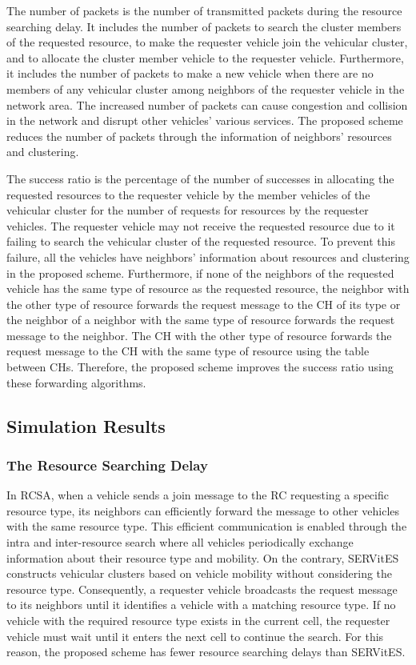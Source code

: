 \documentclass[sensors,article,accept,moreauthors,pdftex]{Definitions/mdpi}
\begin{document}
The number of packets is the number of transmitted packets during the resource searching delay.
It includes the number of packets to search the cluster members of the requested resource, to make the requester vehicle join the vehicular cluster, and to allocate the cluster member vehicle to the requester vehicle.
Furthermore, it includes the number of packets to make a new vehicle when there are no members of any vehicular cluster among neighbors of the requester vehicle in the network area.
The increased number of packets can cause congestion and collision in the network and disrupt other vehicles' various services.
The proposed scheme reduces the number of packets through the information of neighbors' resources and clustering.

The success ratio is the percentage of the number of successes in allocating the requested resources to the requester vehicle by the member vehicles of the vehicular cluster for the number of requests for resources by the requester vehicles.
The requester vehicle may not receive the requested resource due to it failing to search the vehicular cluster of the requested resource.
To prevent this failure, all the vehicles have neighbors' information about resources and clustering in the proposed scheme.
Furthermore, if none of the neighbors of the requested vehicle has the same type of resource as the requested resource, the neighbor with the other type of resource forwards the request message to the CH of its type or the neighbor of a neighbor with the same type of resource forwards the request message to the neighbor.
The CH with the other type of resource forwards the request message to the CH with the same type of resource using the table between CHs.
Therefore, the proposed scheme improves the success ratio using these forwarding algorithms.


\subsection{Simulation Results} \label{sec.s2}

\subsubsection{The Resource Searching Delay}



In RCSA, when a vehicle sends a join message to the RC requesting a specific resource type, its neighbors can efficiently forward the message to other vehicles with the same resource type. This efficient communication is enabled through the intra and inter-resource search where all vehicles periodically exchange information about their resource type and mobility. On the contrary, SERVitES constructs vehicular clusters based on vehicle mobility without considering the resource type. Consequently, a requester vehicle broadcasts the request message to its neighbors until it identifies a vehicle with a matching resource type. If no vehicle with the required resource type exists in the current cell, the requester vehicle must wait until it enters the next cell to continue the search. For this reason, the proposed scheme has fewer resource searching delays than SERVitES.
\end{document}
